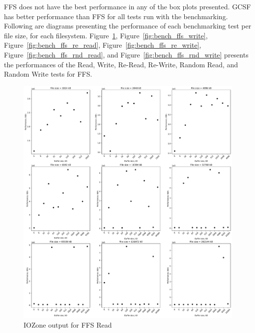 \FloatBarrier

\gls{FFS} does not have the best performance in any of the box plots presented. \gls{GCSF} has better performance than \gls{FFS} for all tests run with the benchmarking. Following are diagrams presenting the performance of each benchmarking test per file size, for each filesystem. Figure~\ref{fig:bench_ffs_read}, Figure~\ref{fig:bench_ffs_write}, Figure~\ref{fig:bench_ffs_re_read}, Figure~\ref{fig:bench_ffs_re_write}, Figure~\ref{fig:bench_ffs_rnd_read}, and Figure~\ref{fig:bench_ffs_rnd_write} presents the performances of the Read, Write, \mbox{Re-Read}, \mbox{Re-Write}, Random Read, and Random Write tests for \gls{FFS}.

\begin{figure}[!htb]
	\label{fig:bench_ffs_read}
	\begin{center}
		\includegraphics[width=1.0\textwidth]{figures/benchmarking/ffs/Read.pdf}
	\end{center}
	\caption{IOZone output for FFS Read}
\end{figure}

